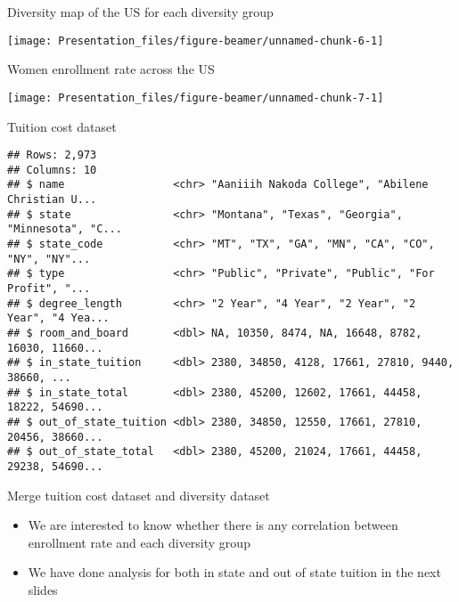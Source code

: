 \documentclass[
  ignorenonframetext,
]{beamer}
\newenvironment{Shaded}{\begin{snugshade}}{\end{snugshade}}
\newcommand{\KeywordTok}[1]{\textcolor[rgb]{0.13,0.29,0.53}{\textbf{#1}}}
\newcommand{\NormalTok}[1]{#1}
\newcommand{\OperatorTok}[1]{\textcolor[rgb]{0.81,0.36,0.00}{\textbf{#1}}}
\newcommand{\StringTok}[1]{\textcolor[rgb]{0.31,0.60,0.02}{#1}}
\providecommand{\tightlist}{%
  \setlength{\itemsep}{0pt}\setlength{\parskip}{0pt}}
\begin{document}
\begin{frame}{Diversity map of the US for each diversity group}
\protect\hypertarget{diversity-map-of-the-us-for-each-diversity-group}{}

\begin{center}\texttt{[image: Presentation\_files/figure-beamer/unnamed-chunk-6-1]} \end{center}

\end{frame}

\begin{frame}{Women enrollment rate across the US}
\protect\hypertarget{women-enrollment-rate-across-the-us}{}

\begin{center}\texttt{[image: Presentation\_files/figure-beamer/unnamed-chunk-7-1]} \end{center}

\end{frame}

\begin{frame}[fragile]{Tuition cost dataset}
\protect\hypertarget{tuition-cost-dataset}{}

\begin{Shaded}
\end{Shaded}

\begin{verbatim}
## Rows: 2,973
## Columns: 10
## $ name                 <chr> "Aaniiih Nakoda College", "Abilene Christian U...
## $ state                <chr> "Montana", "Texas", "Georgia", "Minnesota", "C...
## $ state_code           <chr> "MT", "TX", "GA", "MN", "CA", "CO", "NY", "NY"...
## $ type                 <chr> "Public", "Private", "Public", "For Profit", "...
## $ degree_length        <chr> "2 Year", "4 Year", "2 Year", "2 Year", "4 Yea...
## $ room_and_board       <dbl> NA, 10350, 8474, NA, 16648, 8782, 16030, 11660...
## $ in_state_tuition     <dbl> 2380, 34850, 4128, 17661, 27810, 9440, 38660, ...
## $ in_state_total       <dbl> 2380, 45200, 12602, 17661, 44458, 18222, 54690...
## $ out_of_state_tuition <dbl> 2380, 34850, 12550, 17661, 27810, 20456, 38660...
## $ out_of_state_total   <dbl> 2380, 45200, 21024, 17661, 44458, 29238, 54690...
\end{verbatim}

\begin{block}{Merge tuition cost dataset and diversity dataset}

\begin{itemize}
\tightlist
\item
  We are interested to know whether there is any correlation between
  enrollment rate and each diversity group
\item
  We have done analysis for both in state and out of state tuition in
  the next slides
\end{itemize}

\end{block}

\end{frame}
\end{document}
